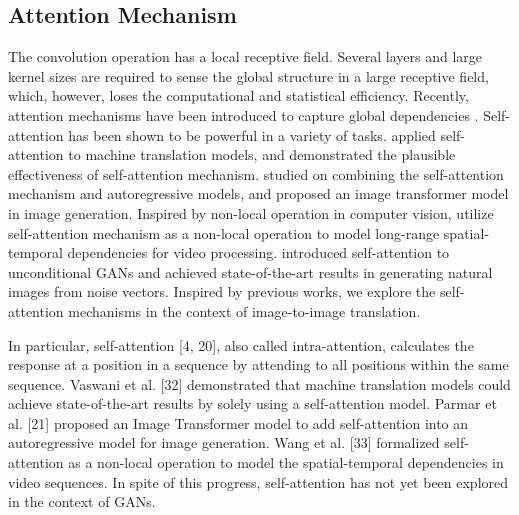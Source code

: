 \subsection{Attention Mechanism}
The convolution operation has a local receptive field. Several layers and large kernel sizes are required to sense the global structure in a large receptive field, which, however, loses the computational and statistical efficiency. Recently, attention mechanisms have been introduced to capture global dependencies \cite{SAGANs-2,34,36,6}.
Self-attention \cite{SAGANs-4,20} has been shown to be powerful in a variety of tasks.
\cite{SAGANs-32} applied self-attention to machine translation models, and demonstrated the plausible effectiveness of self-attention mechanism. 
\cite{SAGANs-21} studied on combining the self-attention mechanism and autoregressive models, and proposed an image transformer model in image generation. 
Inspired by non-local operation in computer vision, \cite{non-local} utilize self-attention mechanism as a non-local operation to model long-range spatial-temporal dependencies for video processing.
\cite{SAGANs} introduced self-attention to unconditional GANs and achieved state-of-the-art results in generating natural images from noise vectors. Inspired by previous works,  we explore the self-attention mechanisms in the context of image-to-image translation. 


In particular, self-attention [4, 20], also called intra-attention, calculates the response at a position in a sequence by attending to all positions within the same sequence. Vaswani et al. [32] demonstrated that machine translation models could achieve state-of-the-art results by solely using a self-attention model. Parmar et al. [21] proposed an Image Transformer model to add self-attention into an autoregressive model for image generation. Wang et al. [33] formalized self-attention as a non-local operation to model the spatial-temporal dependencies in video sequences. In spite of this progress, self-attention has not yet been explored in the context of GANs. 